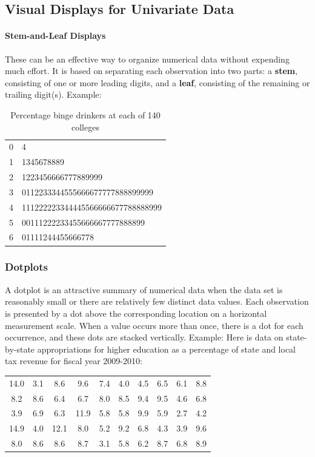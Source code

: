 \documentclass{article}
\newcommand{\p}[1]{\paragraph{#1}} %
\begin{document}
	\subsection{Visual Displays for Univariate Data} %
	\p{Stem-and-Leaf Displays} These can be an effective way to organize numerical data without 
	expending much effort. It is based on separating each observation into two parts: a 
	\textbf{stem}, consisting of one or more leading digits, and a \textbf{leaf}, consisting of the 
	remaining or trailing digit(s). Example:
	\begin{table}[!htb]
	\centering
	\begin{tabular}{ l l }
		0 & 4 \\
		1 & 1345678889 \\
		2 & 1223456666777889999 \\
		3 & 0112233344555666677777888899999 \\
		4 & 111222223344445566666677788888999 \\
		5 & 00111222233455666667777888899 \\
		6 & 01111244455666778
	\end{tabular}
	\caption{Percentage binge drinkers at each of 140 colleges}
	\label{tab:binge_drinkers}
	\end{table}
	
		\subsubsection{Dotplots} 
		A dotplot is an attractive summary of numerical data when the data set is reasonably small 
		or there are relatively few distinct data values. Each observation is presented by a dot 
		above the corresponding location on a horizontal measurement scale. When a value 
		occurs more than once, there is a dot for each occurrence, and these dots are stacked 
		vertically. Example: Here is data on state-by-state appropriations for higher education as a 
		percentage of state and local tax revenue for fiscal year 2009-2010: \\
	
		\begin{center}
		\begin{tabular}{ c c c c c c c c c c }
			14.0 & 3.1 & 8.6   & 9.6   & 7.4 & 4.0 & 4.5 & 6.5 & 6.1 & 8.8 \\
			8.2   & 8.6 & 6.4   & 6.7   & 8.0 & 8.5 & 9.4 & 9.5 & 4.6 & 6.8 \\
			3.9   & 6.9 & 6.3   & 11.9 & 5.8 & 5.8 & 9.9 & 5.9 & 2.7 & 4.2 \\
			14.9 & 4.0 & 12.1 & 8.0   & 5.2 & 9.2 & 6.8 & 4.3 & 3.9 & 9.6 \\
			8.0   & 8.6 & 8.6   & 8.7   & 3.1 & 5.8 & 6.2 & 8.7 & 6.8 & 8.9 \\
		\end{tabular}
		\end{center}
\end{document}
